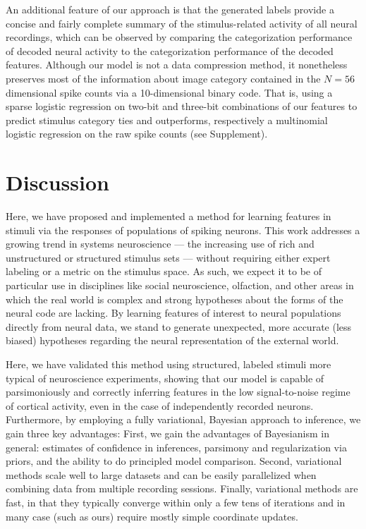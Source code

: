 \documentclass[10pt,letterpaper]{article}
\begin{document}
An additional feature of our approach is that the generated labels provide a concise and fairly complete summary of the stimulus-related activity of all neural recordings, which can be observed by comparing the categorization performance of decoded neural activity to the categorization performance of the decoded features. Although our model is not a data compression method, it nonetheless preserves most of the information about image category contained in the $N=56$ dimensional spike counts via a 10-dimensional binary code. That is, using a sparse logistic regression on two-bit and three-bit combinations of our features to predict stimulus category ties and outperforms, respectively a multinomial logistic regression on the raw spike counts (see Supplement).

\section*{Discussion}

Here, we have proposed and implemented a method for learning features in stimuli via the responses of populations of spiking neurons. This work addresses a growing trend in systems neuroscience --- the increasing use of rich and unstructured or structured stimulus sets --- without requiring either expert labeling or a metric on the stimulus space. As such, we expect it to be of particular use in disciplines like social neuroscience, olfaction, and other areas in which the real world is complex and strong hypotheses about the forms of the neural code are lacking. By learning features of interest to neural populations directly from neural data, we stand to generate unexpected, more accurate (less biased) hypotheses regarding the neural representation of the external world.

Here, we have validated this method using structured, labeled stimuli more typical of neuroscience experiments, showing that our model is capable of parsimoniously and correctly inferring features in the low signal-to-noise regime of cortical activity, even in the case of independently recorded neurons. Furthermore, by employing a fully variational, Bayesian approach to inference, we gain three key advantages: First, we gain the advantages of Bayesianism in general: estimates of confidence in inferences, parsimony and regularization via priors, and the ability to do principled model comparison. Second, variational methods scale well to large datasets and can be easily parallelized when combining data from multiple recording sessions. Finally, variational methods are fast, in that they typically converge within only a few tens of iterations and in many case (such as ours) require mostly simple coordinate updates.
\end{document}
